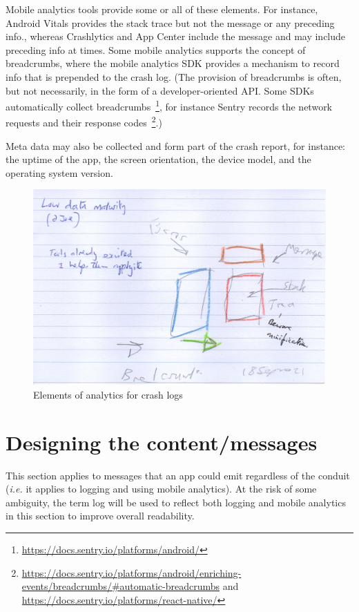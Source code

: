 Mobile analytics tools provide some or all of these elements. For instance, Android Vitals provides the stack trace but not the message or any preceding info., whereas Crashlytics and App Center include the message and may include preceding info at times. Some mobile analytics supports the concept of breadcrumbs, where the mobile analytics SDK provides a mechanism to record info that is prepended to the crash log. (The provision of breadcrumbs is often, but not necessarily, in the form of a developer-oriented API. Some SDKs automatically collect breadcrumbs~\footnote{\url{https://docs.sentry.io/platforms/android/}}, for instance Sentry records the network requests and their response codes~\footnote{\url{https://docs.sentry.io/platforms/android/enriching-events/breadcrumbs/\#automatic-breadcrumbs} and \url{https://docs.sentry.io/platforms/react-native/}}.)

Meta data may also be collected and form part of the crash report, for instance: the uptime of the app, the screen orientation, the device model, and the operating system version.


\begin{figure}
    \centering
    \includegraphics[width=15cm]{images/rough-sketches/five-elements-of-crash-logs.jpeg}
    \caption{Elements of analytics for crash logs}
    \label{fig:elements-of-crash-logs}
\end{figure}



\section{Designing the content/messages} 
This section applies to messages that an app could emit regardless of the conduit (\emph{i.e.} it applies to logging and using mobile analytics). At the risk of some ambiguity, the term log will be used to reflect both logging and mobile analytics in this section to improve overall readability.

